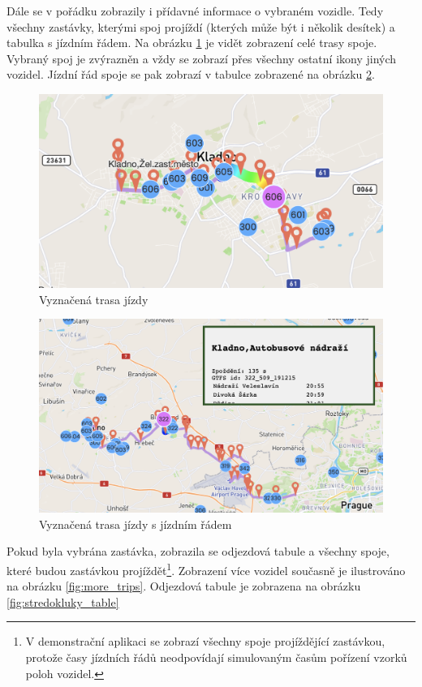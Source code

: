 \bigbreak


Dále se v pořádku zobrazily i přídavné informace o vybraném vozidle. Tedy všechny zastávky, kterými spoj projíždí (kterých může být i několik desítek) a tabulka s jízdním řádem. Na obrázku \ref{fig:trip_path} je vidět zobrazení celé trasy spoje. Vybraný spoj je zvýrazněn a vždy se zobrazí přes všechny ostatní ikony jiných vozidel. Jízdní řád spoje se pak zobrazí v tabulce zobrazené na obrázku \ref{fig:kladno_aut_322}.


\begin{figure}
   \centering
 \includegraphics[width=0.7\linewidth]{../img/trip_path.png}
 \caption{Vyznačená trasa jízdy}
 \label{fig:trip_path}
\end{figure}


\begin{figure}
   \centering
 \includegraphics[width=0.7\linewidth]{../img/kladno_aut_322.png}
 \caption{Vyznačená trasa jízdy s jízdním řádem}
 \label{fig:kladno_aut_322}
\end{figure}


\bigbreak


Pokud byla vybrána zastávka, zobrazila se odjezdová tabule a všechny spoje, které budou zastávkou projíždět\footnote{V demonstrační aplikaci se zobrazí všechny spoje projíždějící zastávkou, protože časy jízdních řádů neodpovídají simulovaným časům pořízení vzorků poloh vozidel.}. Zobrazení více vozidel současně je ilustrováno na obrázku \ref{fig:more_trips}. Odjezdová tabule je zobrazena na obrázku \ref{fig:stredokluky_table}


